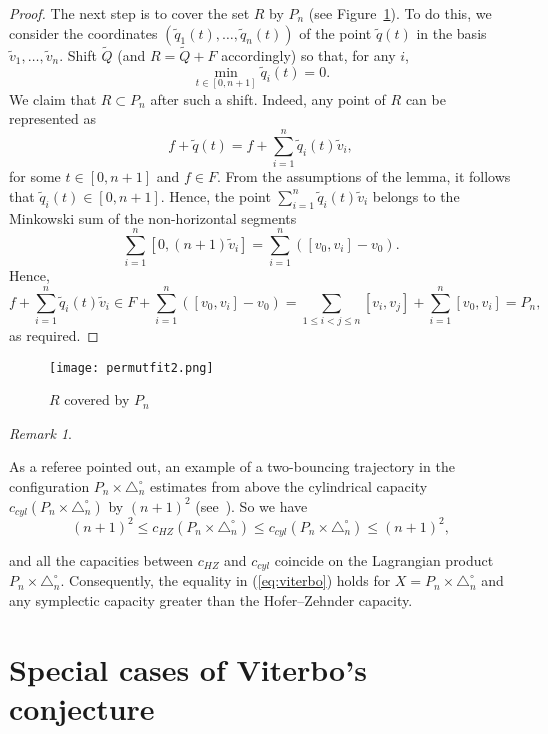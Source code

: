\documentclass[12pt,a4paper,oneside]{amsart}
\theoremstyle{definition}
\theoremstyle{remark}
\newtheorem{remark}[theorem]{Remark}
\numberwithin{equation}{section}
\begin{document}
\begin{proof}
The next step is to cover the set $R$ by $P_n$ (see Figure~\ref{pic:permutfit2}). To do this, we consider the coordinates $(\widetilde q_1(t), \ldots, \widetilde q_n(t))$ of the point $\widetilde q(t)$ in the basis $\widetilde v_1, \ldots, \widetilde v_n$. Shift $\widetilde Q$ (and $R = \widetilde Q + F$ accordingly) so that, for any $i$,
$$
\min\limits_{t\in [0,n+1]} \widetilde q_i(t) = 0.
$$
We claim that $R \subset P_n$ after such a shift. Indeed, any point of $R$ can be represented as
$$
f+ \widetilde q(t) = f + \sum\limits_{i=1}^n \widetilde q_i(t)\widetilde v_i,
$$
for some $t\in [0,n+1]$ and $f \in F$. From the assumptions of the lemma, it follows that $\widetilde q_i(t) \in [0,n+1]$. Hence, the point $\sum\limits_{i=1}^n \widetilde q_i(t) \widetilde v_i$ belongs to the Minkowski sum of the non-horizontal segments
$$
\sum\limits_{i=1}^n [0,(n+1)\widetilde v_i] = \sum\limits_{i=1}^n ([v_0, v_i] - v_0).
$$
Hence,
$$
f + \sum\limits_{i=1}^n \widetilde q_i(t) \widetilde v_i \in F + \sum\limits_{i=1}^n ([v_0, v_i] - v_0) = \sum\limits_{1\le i < j\le n} [v_i, v_j] + \sum\limits_{i=1}^n [v_0, v_i] = P_n,
$$
as required.
\end{proof}
\begin{figure}[h]
\centering
\texttt{[image: permutfit2.png]}
\caption{$R$ covered by $P_n$}
\label{pic:permutfit2}
\end{figure}


\begin{remark}
\label{rem:uppercapacity}

As a referee pointed out, an example of a two-bouncing trajectory in the configuration $P_n \times \triangle_n^\circ$ estimates from above the cylindrical capacity $c_{cyl}(P_n \times \triangle_n^\circ)$ by $(n+1)^2$ (see~\cite[Remark 4.2]{artstein2014from}). So we have
$$
(n+1)^2 \le c_{HZ}(P_n \times \triangle_n^\circ) \le c_{cyl}(P_n \times \triangle_n^\circ) \le (n+1)^2,
$$

and all the capacities between $c_{HZ}$ and $c_{cyl}$ coincide on the Lagrangian product $P_n \times \triangle_n^\circ$.
Consequently, the equality in (\ref{eq:viterbo}) holds for $X = P_n \times \triangle_n^\circ$ and any symplectic capacity greater than the Hofer--Zehnder capacity.

\end{remark}

\section{Special cases of Viterbo's conjecture}
\label{sec:inequality}
\end{document}
